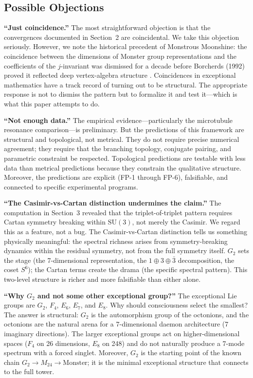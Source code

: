 \documentclass[12pt,a4paper]{article}
\begin{document}
\subsection{Possible Objections}

\textbf{``Just coincidence.''} The most straightforward objection is that the convergences documented in Section~2 are coincidental. We take this objection seriously. However, we note the historical precedent of Monstrous Moonshine: the coincidence between the dimensions of Monster group representations and the coefficients of the $j$-invariant was dismissed for a decade before Borcherds (1992) proved it reflected deep vertex-algebra structure \citep{Borcherds1992}. Coincidences in exceptional mathematics have a track record of turning out to be structural. The appropriate response is not to dismiss the pattern but to formalize it and test it---which is what this paper attempts to do.

\textbf{``Not enough data.''} The empirical evidence---particularly the microtubule resonance comparison---is preliminary. But the predictions of this framework are structural and topological, not metrical. They do not require precise numerical agreement; they require that the branching topology, conjugate pairing, and parametric constraint be respected. Topological predictions are testable with less data than metrical predictions because they constrain the qualitative structure. Moreover, the predictions are explicit (FP-1 through FP-6), falsifiable, and connected to specific experimental programs.

\textbf{``The Casimir-vs-Cartan distinction undermines the claim.''} The computation in Section~3 revealed that the triplet-of-triplet pattern requires Cartan symmetry breaking within $\mathrm{SU}(3)$, not merely the Casimir. We regard this as a feature, not a bug. The Casimir-vs-Cartan distinction tells us something physically meaningful: the spectral richness arises from symmetry-breaking dynamics within the residual symmetry, not from the full symmetry itself. $G_2$ sets the stage (the 7-dimensional representation, the $1 \oplus 3 \oplus \bar{3}$ decomposition, the coset $S^6$); the Cartan terms create the drama (the specific spectral pattern). This two-level structure is richer and more falsifiable than either alone.

\textbf{``Why $G_2$ and not some other exceptional group?''} The exceptional Lie groups are $G_2$, $F_4$, $E_6$, $E_7$, and $E_8$. Why should consciousness select the smallest? The answer is structural: $G_2$ is the automorphism group of the octonions, and the octonions are the natural arena for a 7-dimensional daemon architecture (7 imaginary directions). The larger exceptional groups act on higher-dimensional spaces ($F_4$ on 26 dimensions, $E_8$ on 248) and do not naturally produce a 7-mode spectrum with a forced singlet. Moreover, $G_2$ is the starting point of the known chain $G_2 \to M_{24} \to \text{Monster}$; it is the minimal exceptional structure that connects to the full tower.
\end{document}
